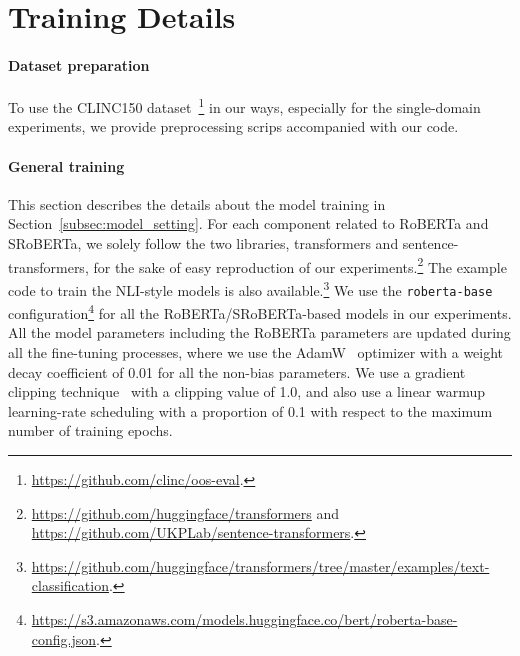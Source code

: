 \section{Training Details} \label{training-details}

\paragraph{Dataset preparation}
To use the CLINC150 dataset~\citep{oos-intent}\footnote{\url{https://github.com/clinc/oos-eval}.} in our ways, especially for the single-domain experiments, we provide preprocessing scrips accompanied with our code.

\paragraph{General training}\label{appendix-general-training}
This section describes the details about the model training in Section~\ref{subsec:model_setting}.
For each component related to RoBERTa and SRoBERTa, we solely follow the two libraries, transformers and sentence-transformers, for the sake of easy reproduction of our experiments.\footnote{\url{https://github.com/huggingface/transformers} and \url{https://github.com/UKPLab/sentence-transformers}.}
The example code to train the NLI-style models is also available.\footnote{\url{https://github.com/huggingface/transformers/tree/master/examples/text-classification}.}
We use the {\tt roberta-base} configuration\footnote{\url{https://s3.amazonaws.com/models.huggingface.co/bert/roberta-base-config.json}.} for all the RoBERTa/SRoBERTa-based models in our experiments.
All the model parameters including the RoBERTa parameters are updated during all the fine-tuning processes, where we use the AdamW~\citep{adamw} optimizer with a weight decay coefficient of 0.01 for all the non-bias parameters.
We use a gradient clipping technique~\citep{clip} with a clipping value of 1.0, and also use a linear warmup learning-rate scheduling with a proportion of 0.1 with respect to the maximum number of training epochs. 



